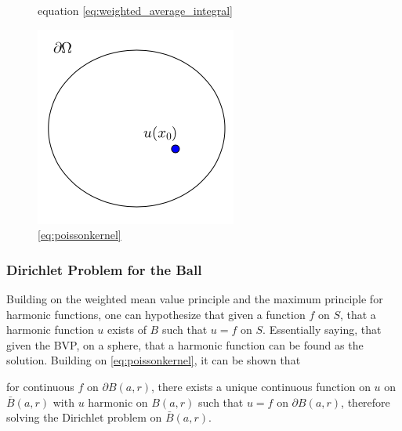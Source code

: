 \begin{figure}[!htb]
  \label{fig:generaloffset}
  \caption{equation \ref{eq:weighted_average_integral}}
\endminipage\hfill
{}%
  \vspace{4.5mm}
  \includegraphics[width=\linewidth]{styles/CircOffset}
  \caption{\ref{eq:poissonkernel}}\label{fig:circoffset}
\endminipage
\end{figure}
  \subsubsection{Dirichlet Problem for the Ball}
  Building on the weighted mean value principle and the maximum principle for harmonic functions,
   one can hypothesize that given a function $f$ on $S$, that a harmonic function $u$
  exists of $B$ such that $u = f$ on $S$. Essentially saying, that given the \gls{BVP},
  on a sphere, that a harmonic function can be found as the solution.  Building on
  \eqref{eq:poissonkernel}, it can be shown that
\begin{theorem}
  for continuous $f$ on  $\partial B(a,r)$,
there exists a unique continuous function on $u$ on $\bar{B}(a,r)$ with $u$ harmonic on
$B(a,r)$ such that $ u = f $ on
$\partial B(a,r)$, therefore solving the Dirichlet problem on $\bar{B}(a,r)$\cite{Axler1992}.
\end{theorem}
